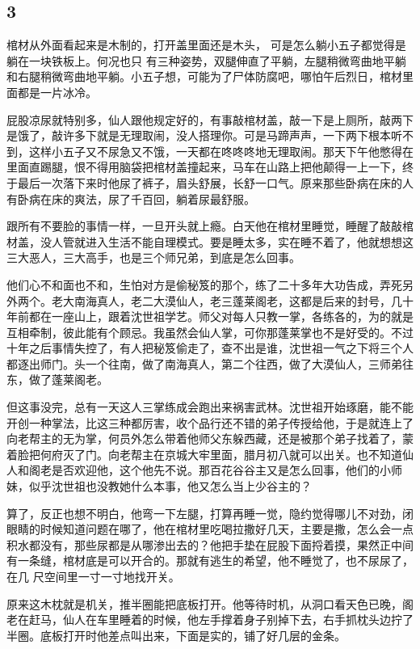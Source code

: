 {\centering\subsection{3}}

棺材从外面看起来是木制的，打开盖里面还是木头，
可是怎么躺小五子都觉得是躺在一块铁板上。何况也只
有三种姿势，双腿伸直了平躺，左腿稍微弯曲地平躺和右腿稍微弯曲地平躺。小五子想，可能为了尸体防腐吧，哪怕午后烈日，棺材里面都是一片冰冷。

屁股凉尿就特别多，仙人跟他规定好的，有事敲棺材盖，敲一下是上厕所，敲两下是饿了，敲许多下就是无理取闹，没人搭理你。可是马蹄声声，一下两下根本听不到，这样小五子又不尿急又不饿，一天都在咚咚咚地无理取闹。那天下午他憋得在里面直踢腿，恨不得用脑袋把棺材盖撞起来，马车在山路上把他颠得一上一下，终于最后一次落下来时他尿了裤子，眉头舒展，长舒一口气。原来那些卧病在床的人有卧病在床的爽法，尿了千百回，躺着尿最舒服。

跟所有不要脸的事情一样，一旦开头就上瘾。白天他在棺材里睡觉，睡醒了敲敲棺材盖，没人管就进入生活不能自理模式。要是睡太多，实在睡不着了，他就想想这三大恶人，三大高手，也是三个师兄弟，到底是怎么回事。

他们心不和面也不和，生怕对方是偷秘笈的那个，练了二十多年大功告成，弄死另外两个。老大南海真人，老二大漠仙人，老三蓬莱阁老，这都是后来的封号，几十年前都在一座山上，跟着沈世祖学艺。师父对每人只教一掌，各练各的，为的就是互相牵制，彼此能有个顾忌。我虽然会仙人掌，可你那蓬莱掌也不是好受的。不过十年之后事情失控了，有人把秘笈偷走了，查不出是谁，沈世祖一气之下将三个人都逐出师门。头一个往南，做了南海真人，第二个往西，做了大漠仙人，三师弟往东，做了蓬莱阁老。

但这事没完，总有一天这人三掌练成会跑出来祸害武林。沈世祖开始琢磨，能不能开创一种掌法，比这三种都厉害，收个品行还不错的弟子传授给他，于是就连上了向老帮主的无为掌，何员外怎么带着他师父东躲西藏，还是被那个弟子找着了，蒙着脸把何府灭了门。向老帮主在京城大牢里面，腊月初八就可以出关。也不知道仙人和阁老是否欢迎他，这个他先不说。那百花谷谷主又是怎么回事，他们的小师妹，似乎沈世祖也没教她什么本事，他又怎么当上少谷主的？

算了，反正也想不明白，他弯一下左腿，打算再睡一觉，隐约觉得哪儿不对劲，闭眼睛的时候知道问题在哪了，他在棺材里吃喝拉撒好几天，主要是撒，怎么会一点积水都没有，那些尿都是从哪渗出去的？他把手垫在屁股下面捋着摸，果然正中间有一条缝，棺材底是可以开合的。那就有逃生的希望，他不睡觉了，也不尿尿了，在几
尺空间里一寸一寸地找开关。

原来这木枕就是机关，推半圈能把底板打开。他等待时机，从洞口看天色已晚，阁老在赶马，仙人在车里睡着的时候，他左手撑着身子别掉下去，右手抓枕头边拧了半圈。底板打开时他差点叫出来，下面是实的，铺了好几层的金条。

